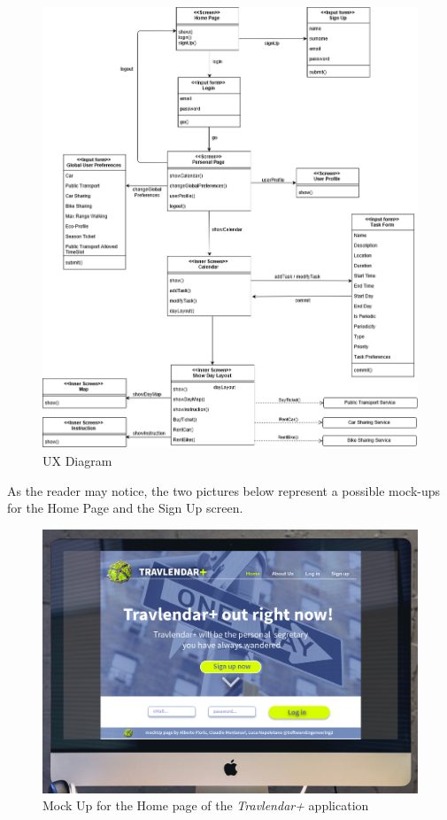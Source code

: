 \begin{figure}[H]
    \centering
    \includegraphics[scale=0.4]{Pictures/UXDiagram/UXDiagram.png}
    \caption{UX Diagram}
\end{figure}

As the reader may notice, the two pictures below represent a possible mock-ups for the Home Page and the Sign Up screen.

\begin{figure}[H]
    \centering
    \includegraphics[scale=0.2]{Pictures/UXDiagram/desktopMockUpHome.png}
    \caption{Mock Up for the Home page of the \emph{Travlendar+} application}
    \label{fig:homePageMockUp}
\end{figure}

